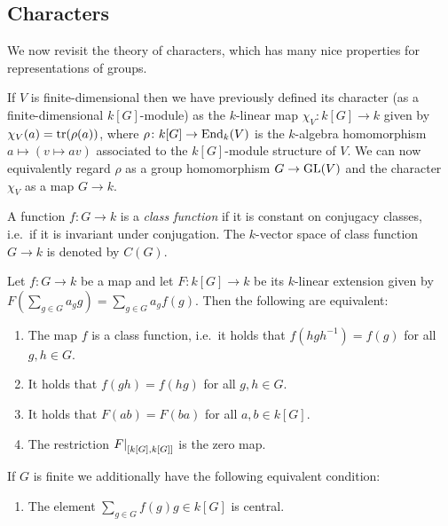 \subsection{Characters}


\begin{fluff}
  We now revisit the theory of characters, which has many nice properties for representations of groups.
  
  If $V$ is finite-dimensional then we have previously defined its character (as a finite-dimensional $k[G]$-module) as the $k$-linear map $\chi_V \colon k[G] \to k$ given by $\chi_V(a) = \operatorname{tr}(\rho(a))$, where $\rho \colon k[G] \to \operatorname{End}_k(V)$ is the $k$-algebra homomorphism $a \mapsto (v \mapsto av)$ associated to the $k[G]$-module structure of $V$.
  We can now equivalently regard $\rho$ as a group homomorphism $G \to \operatorname{GL}(V)$ and the character $\chi_V$ as a map $G \to k$.
\end{fluff}


\begin{definition}
  A function $f \colon G \to k$ is a \emph{class function} if it is constant on conjugacy classes, i.e.\ if it is invariant under conjugation.
  The $k$-vector space of class function $G \to k$ is denoted by $C(G)$.
\end{definition}


\begin{lemma}
  \label{lemma: characterisation class functions}
  Let $f \colon G \to k$ be a map and let $F \colon k[G] \to k$ be its $k$-linear extension given by $F(\sum_{g \in G} a_g g) = \sum_{g \in G} a_g f(g)$.
  Then the following are equivalent:
  \begin{enumerate}
    \item
      \label{enumerate: f class function}
      The map $f$ is a class function, i.e.\ it holds that $f(h g h^{-1}) = f(g)$ for all $g, h \in G$.
    \item
      \label{enumerate: f symmetric}
      It holds that $f(gh) = f(hg)$ for all $g, h \in G$.
    \item
      \label{enumerate: F symmetric}
      It holds that $F(ab) = F(ba)$ for all $a, b \in k[G]$.
    \item
      \label{enumerate: F zero on commutator}
      The restriction $\restrict{F}{[k[G],k[G]]}$ is the zero map.
  \end{enumerate}
  If $G$ is finite we additionally have the following equivalent condition:
  \begin{enumerate}[resume]
    \item
      \label{enumerate : element of group algebra}
      The element $\sum_{g \in G} f(g) g \in k[G]$ is central.
  \end{enumerate}
\end{lemma}



